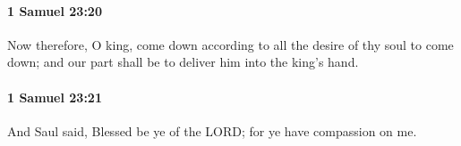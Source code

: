 		\paragraph{1 Samuel 23:20} %
			\label{1SAMUEL-23-20}

			Now therefore, O king, come down according to all the desire of thy soul to come down; and our part shall be to deliver him into the king’s hand.


		\paragraph{1 Samuel 23:21} %
			\label{1SAMUEL-23-21}

			And Saul said, Blessed be ye of the LORD; for ye have compassion on me.


